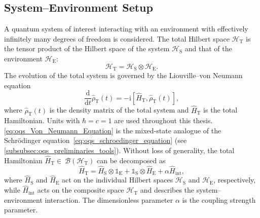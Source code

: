 \subsection{System--Environment Setup}
\label{sec:oqs_setup_system_environment}

A quantum system of interest interacting with an environment with effectively infinitely many degrees of freedom is considered. The total Hilbert space $\mathcal{H}_{\mathrm{T}}$ is the tensor product of the Hilbert space of the system $\mathcal{H}_{\mathrm{S}}$ and that of the environment $\mathcal{H}_{\mathrm{E}}$:
\begin{equation*}
	\mathcal{H}_{\mathrm{T}} = \mathcal{H}_{\mathrm{S}} \otimes \mathcal{H}_{\mathrm{E}}.
\end{equation*}
The evolution of the total system is governed by the Liouville--von Neumann equation
\begin{equation}
	\frac{\mathrm{d}}{\mathrm{d}t}\hat{\rho}_{\mathrm{T}}(t) = -\mathrm{i}[\hat{H}_{\mathrm{T}}, \hat{\rho}_{\mathrm{T}}(t)],
	\label{eq:oqs_Von_Neumann_Equation}
\end{equation}
where $\hat{\rho}_{\mathrm{T}}(t)$ is the density matrix of the total system and $\hat{H}_{\mathrm{T}}$ is the total Hamiltonian. Units with $\hbar = c = 1$ are used throughout this thesis. \autoref{eq:oqs_Von_Neumann_Equation} is the mixed-state analogue of the Schrödinger equation~\autoref{eq:oqs_schroedinger_equation} (see \autoref{subsubsec:oqs_preliminaries_tools}).
Without loss of generality, the total Hamiltonian $\hat{H}_{\mathrm{T}} \in~\mathcal{B}(\mathcal{H}_{\mathrm{T}})$ can be decomposed as
\begin{equation*}
	\hat{H}_{\mathrm{T}} = \hat{H}_{\mathrm{S}} \otimes \mathds{1}_{\mathrm{E}} + \mathds{1}_{\mathrm{S}} \otimes \hat{H}_{\mathrm{E}} + \alpha \hat{H}_{\mathrm{int}},
\end{equation*}
where $\hat{H}_{\mathrm{S}}$ and $\hat{H}_{\mathrm{E}}$ act on the individual Hilbert spaces $\mathcal{H}_{\mathrm{S}}$ and $\mathcal{H}_{\mathrm{E}}$, respectively, while $\hat{H}_{\mathrm{int}}$ acts on the composite space $\mathcal{H}_{\mathrm{T}}$ and describes the system--environment interaction. The dimensionless parameter $\alpha$ is the coupling strength parameter.

